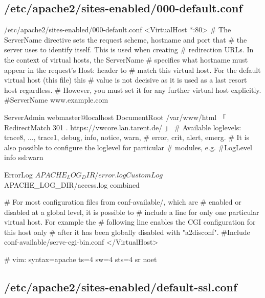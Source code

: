 \else%

\subsection{/etc/apache2/sites-enabled/000-default.conf}\label{subsec:refcfg-apache-default}

\begin{lstdump}[tabsize=2]{/etc/apache2/sites-enabled/000-default.conf}
<VirtualHost *:80>
	# The ServerName directive sets the request scheme, hostname and port that
	# the server uses to identify itself. This is used when creating
	# redirection URLs. In the context of virtual hosts, the ServerName
	# specifies what hostname must appear in the request's Host: header to
	# match this virtual host. For the default virtual host (this file) this
	# value is not decisive as it is used as a last resort host regardless.
	# However, you must set it for any further virtual host explicitly.
	#ServerName www.example.com

	ServerAdmin webmaster@localhost
	DocumentRoot /var/www/html
「
	RedirectMatch 301 . https://vwcore.lan.tarent.de/
」
	# Available loglevels: trace8, ..., trace1, debug, info, notice, warn,
	# error, crit, alert, emerg.
	# It is also possible to configure the loglevel for particular
	# modules, e.g.
	#LogLevel info ssl:warn

	ErrorLog ${APACHE_LOG_DIR}/error.log
	CustomLog ${APACHE_LOG_DIR}/access.log combined

	# For most configuration files from conf-available/, which are
	# enabled or disabled at a global level, it is possible to
	# include a line for only one particular virtual host. For example the
	# following line enables the CGI configuration for this host only
	# after it has been globally disabled with "a2disconf".
	#Include conf-available/serve-cgi-bin.conf
</VirtualHost>

# vim: syntax=apache ts=4 sw=4 sts=4 sr noet
\end{lstdump}

\subsection{/etc/apache2/sites-enabled/default-ssl.conf}\label{subsec:refcfg-apache-defssl}

